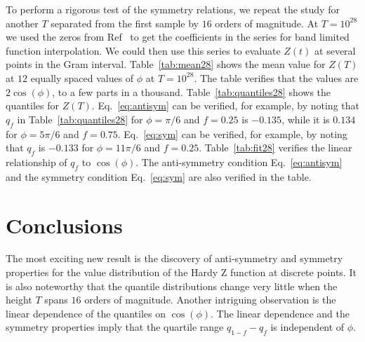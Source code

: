 \documentclass[twoside]{article}
\begin{document}
To perform a rigorous test of the symmetry relations, we repeat the study for another $T$ separated from the first sample by $16$ orders of magnitude. At $T=10^{28}$ we used the  zeros from Ref~\cite{hiary 2010} to get the coefficients in the series for band limited function interpolation. We could then use this series to evaluate  $Z(t)$  at several points in the Gram interval.
Table~\ref{tab:mean28} shows the mean value for $Z(T)$ at $12$ equally spaced values of $\phi$ at $T=10^{28}$. The table verifies that the values are $2\cos(\phi)$, to a few parts in a thousand. Table~\ref{tab:quantiles28} shows the quantiles for $Z(T)$.  Eq.~\ref{eq:antisym} can be verified, for example, by noting that $q_f$ in Table~\ref{tab:quantiles28}
for $\phi=\pi/6$ and $f=0.25$ is $-0.135$, while it is $0.134$ for $\phi=5\pi/6$ and $f=0.75$. Eq.~\ref{eq:sym} can be verified, for example, by noting that $q_f$ is $-0.133$ for $\phi=11\pi/6$ and $f=0.25$. Table~\ref{tab:fit28} verifies the linear relationship of $q_f$ to $\cos(\phi)$. The anti-symmetry condition Eq.~\ref{eq:antisym}  and the symmetry condition Eq.~\ref{eq:sym} are also verified in the table.

\section{\label{conclusions}Conclusions}

The most exciting new result is the discovery of anti-symmetry and symmetry properties for the value distribution of the Hardy Z function at discrete points. It is also noteworthy that the quantile distributions change very little when the height $T$ spans $16$ orders of magnitude. Another intriguing observation is the linear dependence of the quantiles on $\cos(\phi)$. The linear dependence and the symmetry properties imply that the quartile range $q_{1-f}-q_f$ is independent of $\phi$.
\end{document}
